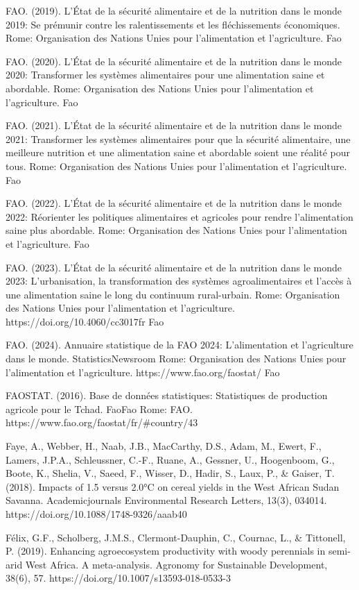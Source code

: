 \documentclass[12pt,oneside]{report}
\begin{document}
FAO. (2019). L'État de la sécurité alimentaire et de la nutrition dans le monde 2019: Se prémunir contre les ralentissements et les fléchissements économiques. Rome: Organisation des Nations Unies pour l'alimentation et l'agriculture. Fao

FAO. (2020). L'État de la sécurité alimentaire et de la nutrition dans le monde 2020: Transformer les systèmes alimentaires pour une alimentation saine et abordable. Rome: Organisation des Nations Unies pour l'alimentation et l'agriculture. Fao

FAO. (2021). L'État de la sécurité alimentaire et de la nutrition dans le monde 2021: Transformer les systèmes alimentaires pour que la sécurité alimentaire, une meilleure nutrition et une alimentation saine et abordable soient une réalité pour tous. Rome: Organisation des Nations Unies pour l'alimentation et l'agriculture. Fao

FAO. (2022). L'État de la sécurité alimentaire et de la nutrition dans le monde 2022: Réorienter les politiques alimentaires et agricoles pour rendre l'alimentation saine plus abordable. Rome: Organisation des Nations Unies pour l'alimentation et l'agriculture. Fao

FAO. (2023). L'État de la sécurité alimentaire et de la nutrition dans le monde 2023: L'urbanisation, la transformation des systèmes agroalimentaires et l'accès à une alimentation saine le long du continuum rural-urbain. Rome: Organisation des Nations Unies pour l'alimentation et l'agriculture. https://doi.org/10.4060/cc3017fr Fao

FAO. (2024). Annuaire statistique de la FAO 2024: L'alimentation et l'agriculture dans le monde. StatisticsNewsroom Rome: Organisation des Nations Unies pour l'alimentation et l'agriculture. https://www.fao.org/faostat/ Fao

FAOSTAT. (2016). Base de données statistiques: Statistiques de production agricole pour le Tchad. FaoFao Rome: FAO. https://www.fao.org/faostat/fr/#country/43

Faye, A., Webber, H., Naab, J.B., MacCarthy, D.S., Adam, M., Ewert, F., Lamers, J.P.A., Schleussner, C.-F., Ruane, A., Gessner, U., Hoogenboom, G., Boote, K., Shelia, V., Saeed, F., Wisser, D., Hadir, S., Laux, P., \& Gaiser, T. (2018). Impacts of 1.5 versus 2.0°C on cereal yields in the West African Sudan Savanna. Academicjournals Environmental Research Letters, 13(3), 034014. https://doi.org/10.1088/1748-9326/aaab40

Félix, G.F., Scholberg, J.M.S., Clermont-Dauphin, C., Cournac, L., \& Tittonell, P. (2019). Enhancing agroecosystem productivity with woody perennials in semi-arid West Africa. A meta-analysis. Agronomy for Sustainable Development, 38(6), 57. https://doi.org/10.1007/s13593-018-0533-3
\end{document}
